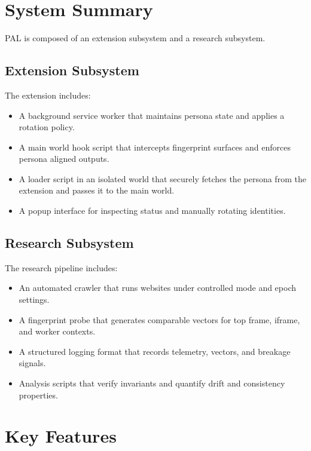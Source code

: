 \documentclass[11pt]{report}
\begin{document}
\section{System Summary}

PAL is composed of an extension subsystem and a research subsystem.

\subsection{Extension Subsystem}

The extension includes:

\begin{itemize}
    \item A background service worker that maintains persona state and applies a rotation policy.
    \item A main world hook script that intercepts fingerprint surfaces and enforces persona aligned outputs.
    \item A loader script in an isolated world that securely fetches the persona from the extension and passes it to the main world.
    \item A popup interface for inspecting status and manually rotating identities.
\end{itemize}

\subsection{Research Subsystem}

The research pipeline includes:

\begin{itemize}
    \item An automated crawler that runs websites under controlled mode and epoch settings.
    \item A fingerprint probe that generates comparable vectors for top frame, iframe, and worker contexts.
    \item A structured logging format that records telemetry, vectors, and breakage signals.
    \item Analysis scripts that verify invariants and quantify drift and consistency properties.
\end{itemize}

\section{Key Features}
\end{document}
